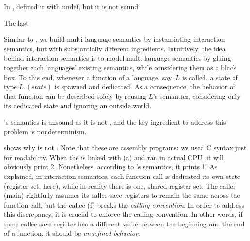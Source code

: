 {In \ccc{}, defined it with undef, but it is not sound


The last






Similar to \ccc{}, we build multi-language semantics by instantiating interaction semantics, but with substantially different ingredients.
Intuitively, the idea behind interaction semantics is to model multi-language semantics by gluing together each languages’ existing semantics, while considering them as a black box.
To this end, whenever a function of a language, say, $L$ is called, a state of type $L.(state)$ is spawned and dedicated.
As a consequence, the behavior of that function can be described solely by reusing $L$'s semantics, considering only its dedicated state and ignoring an outside world.












\ccc{}'s semantics is unsound as it is not \lbound{}, and the key ingredient to address this problem is nondeterminism.

 shows why \ccc{} is not \lbound{}.
Note that these are assembly programs: we used C syntax just for readability.
When the  is linked with (a) and ran in actual CPU, it will obviously print 2.
Nonetheless, according to \ccc{}'s semantics, it prints 1!
As explained, in interaction semantics, each function call is dedicated its own state (register set, here), while in reality there is one, shared register set.
The caller (main) rightfully assumes its callee-save registers to remain the same across the function call, but the callee (f) breaks the \textit{calling convention}.
In order to address this discrepancy, it is crucial to enforce the calling convention. %
In other words, if some callee-save register has a different value between the beginning and the end of a function, it should be \textit{undefined behavior}.

}
